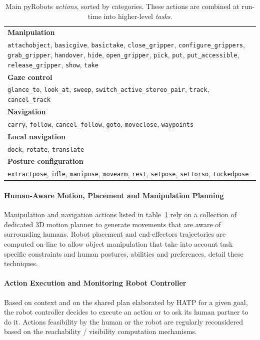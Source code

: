 \documentclass[preprint,3p,times]{elsarticle}
\begin{document}
\begin{table}
\begin{center}
\begin{tabular}{p{8cm}}
\hline
    {\bf Manipulation} \\
     {\tt attachobject}, {\tt basicgive}, {\tt basictake}, {\tt close\_gripper}, {\tt configure\_grippers}, {\tt grab\_gripper}, {\tt handover}, {\tt hide}, {\tt open\_gripper}, {\tt pick}, {\tt put}, {\tt put\_accessible}, {\tt release\_gripper}, {\tt show}, {\tt take} \\
\hline
    {\bf Gaze control} \\
     {\tt glance\_to}, {\tt look\_at}, {\tt sweep}, {\tt switch\_active\_stereo\_pair}, {\tt track}, {\tt cancel\_track} \\
\hline
    {\bf Navigation} \\
     {\tt carry}, {\tt follow}, {\tt cancel\_follow}, {\tt goto}, {\tt moveclose}, {\tt waypoints} \\
\hline
    {\bf Local navigation} \\
     {\tt dock}, {\tt rotate}, {\tt translate} \\
\hline
    {\bf Posture configuration} \\
     {\tt extractpose}, {\tt idle}, {\tt manipose}, {\tt movearm}, {\tt rest}, {\tt setpose}, {\tt settorso}, {\tt tuckedpose} \\
\hline
\end{tabular}
\end{center}
\caption{Main {\sc pyRobots} \emph{actions}, sorted by categories. These
actions are combined at run-time into higher-level \emph{tasks}.}

\label{table|pyrobots_actions}
\end{table}

\paragraph{Human-Aware Motion, Placement and Manipulation Planning}
Manipulation and navigation actions listed in
table~\ref{table|pyrobots_actions} rely on a collection of dedicated 3D motion
planner to generate movements that are aware of surrounding humans. Robot
placement and end-effectors trajectories are computed on-line to allow object
manipulation that take into account task specific constraints and human
postures, abilities and preferences. \cite{Sisbot2008, Mainprice2011,
Pandey2011} detail these techniques.


\paragraph{Action Execution and Monitoring Robot Controller}
Based on context and on the shared plan elaborated by HATP for a given goal,
the robot controller decides to execute an action or to ask its human
partner to do it.  Actions feasibility by the human or the robot are
regularly reconsidered based on the reachability / visibility
computation mechanisms.
\end{document}
